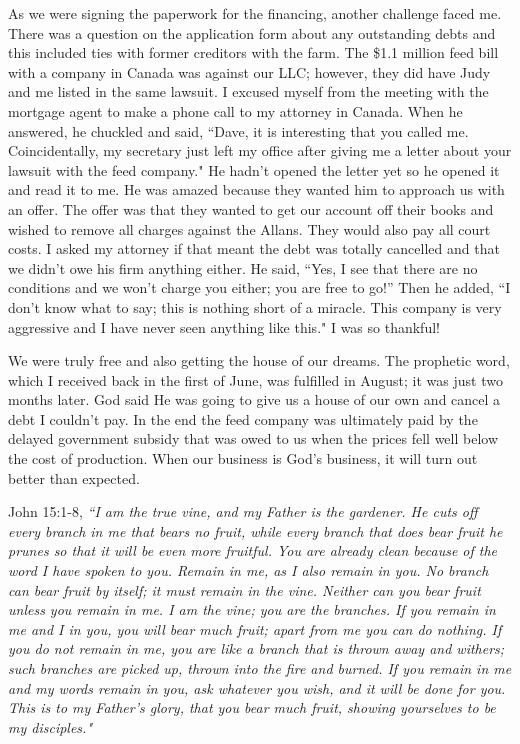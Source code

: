 \documentclass[oneside]{book}
\begin{document}
As we were signing the paperwork for the financing, another challenge faced me. There was a question on the application form about any outstanding debts and this included ties with former creditors with the farm. The \$1.1 million feed bill with a company in Canada was against our LLC; however, they did have Judy and me listed in the same lawsuit. I excused myself from the meeting with the mortgage agent to make a phone call to my attorney in Canada. When he answered, he chuckled and said, ``Dave, it is interesting that you called me. Coincidentally, my secretary just left my office after giving me a letter about your lawsuit with the feed company." He hadn't opened the letter yet so he opened it and read it to me. He was amazed because they wanted him to approach us with an offer. The offer was that they wanted to get our account off their books and wished to remove all charges against the Allans. They would also pay all court costs. I asked my attorney if that meant the debt was totally cancelled and that we didn't owe his firm anything either. He said, ``Yes, I see that there are no conditions and we won't charge you either; you are free to go!'' Then he added, ``I don't know what to say; this is nothing short of a miracle. This company is very aggressive and I have never seen anything like this." I was so thankful!

We were truly free and also getting the house of our dreams. The prophetic word, which I received back in the first of June, was fulfilled in August; it was just two months later. God said He was going to give us a house of our own and cancel a debt I couldn't pay. In the end the feed company was ultimately paid by the delayed government subsidy that was owed to us when the prices fell well below the cost of production. When our business is God's business, it will turn out better than expected. 

John 15:1-8, \textit{``I am the true vine, and my Father is the gardener. He cuts off every branch in me that bears no fruit, while every branch that does bear fruit he prunes so that it will be even more fruitful. You are already clean because of the word I have spoken to you. Remain in me, as I also remain in you. No branch can bear fruit by itself; it must remain in the vine. Neither can you bear fruit unless you remain in me. I am the vine; you are the branches. If you remain in me and I in you, you will bear much fruit; apart from me you can do nothing. If you do not remain in me, you are like a branch that is thrown away and withers; such branches are picked up, thrown into the fire and burned. If you remain in me and my words remain in you, ask whatever you wish, and it will be done for you. This is to my Father's glory, that you bear much fruit, showing yourselves to be my disciples."}
\end{document}

